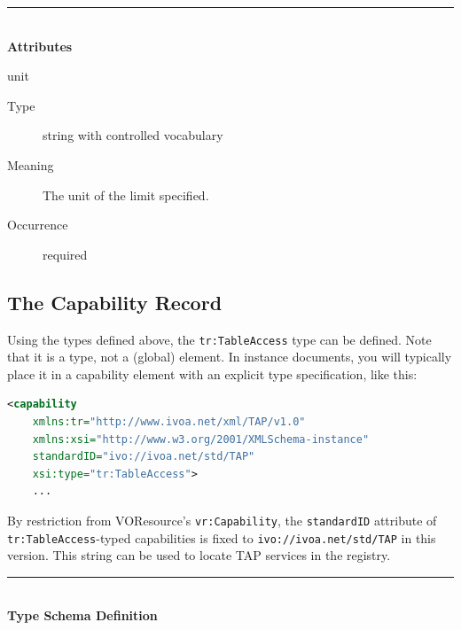 \documentclass{ivoa}
\begin{document}
\noindent\rule[-2pt]{\textwidth}{0.5pt}\\
					\textbf{ Attributes}

\begin{bigdescription}
\item[unit]
\begin{description}
\item[Type\quad] string with controlled vocabulary
\item[Meaning\quad] 
            The unit of the limit specified.
            
\item[Occurrence\quad] required




\end{description}


\end{bigdescription}



\subsection{The Capability Record}

\label{caprec}

Using the types defined above, the 
\texttt{tr:TableAccess} type can be defined.  Note that
it is a type, not a (global) element.  In instance documents, you
will typically place it in a capability element with an explicit
type specification, like this:


\begin{lstlisting}[language=XML]
  <capability 
    xmlns:tr="http://www.ivoa.net/xml/TAP/v1.0" 
    xmlns:xsi="http://www.w3.org/2001/XMLSchema-instance" 
    standardID="ivo://ivoa.net/std/TAP" 
    xsi:type="tr:TableAccess">
    ...
\end{lstlisting}

By restriction from VOResource's \texttt{vr:Capability}, the 
\texttt{standardID} attribute of \texttt{tr:TableAccess}-typed 
capabilities is fixed to \texttt{ivo://ivoa.net/std/TAP} in this version.
This string can be used to locate TAP services in the registry.

\noindent\rule[-2pt]{\textwidth}{0.5pt}\\
			\textbf{ Type Schema Definition}
\end{document}
